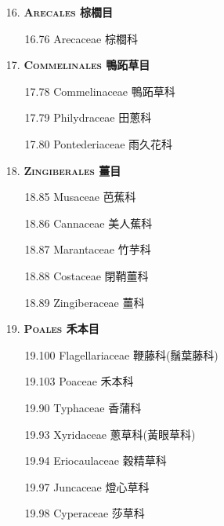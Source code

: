 \begin{enumerate}
  \item[16. ] \textbf{\textsc{Arecales} 棕櫚目} 
    \begin{enumerate}
      \item[16.76] Arecaceae 棕櫚科  
        
    \end{enumerate}
  \item[17. ] \textbf{\textsc{Commelinales} 鴨跖草目} 
    \begin{enumerate}
      \item[17.78] Commelinaceae 鴨跖草科  
        
      \item[17.79] Philydraceae 田蔥科  
        
      \item[17.80] Pontederiaceae 雨久花科  
        
    \end{enumerate}
  \item[18. ] \textbf{\textsc{Zingiberales} 薑目} 
    \begin{enumerate}
      \item[18.85] Musaceae 芭蕉科  
        
      \item[18.86] Cannaceae 美人蕉科  
        
      \item[18.87] Marantaceae 竹芋科  
        
      \item[18.88] Costaceae 閉鞘薑科  
        
      \item[18.89] Zingiberaceae 薑科  
        
    \end{enumerate}
  \item[19. ] \textbf{\textsc{Poales} 禾本目} 
    \begin{enumerate}
      \item[19.100] Flagellariaceae 鞭藤科(鬚葉藤科)  
        
      \item[19.103] Poaceae 禾本科  
        
      \item[19.90] Typhaceae 香蒲科  
        
      \item[19.93] Xyridaceae 蔥草科(黃眼草科)  
        
      \item[19.94] Eriocaulaceae 穀精草科  
        
      \item[19.97] Juncaceae 燈心草科  
        
      \item[19.98] Cyperaceae 莎草科  
        
    \end{enumerate}
\end{enumerate}
